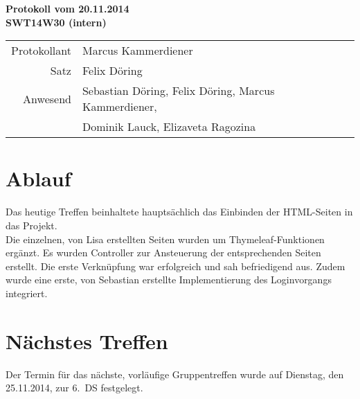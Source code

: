 \documentclass{scrartcl}
\begin{document}
\begin{center}
\LARGE \bf{Protokoll vom 20.11.2014 \\
SWT14W30 (intern)}
\end{center}

\begin{tabular}{rp{10cm}}
Protokollant & Marcus Kammerdiener \\
Satz & Felix Döring \\
Anwesend & Sebastian Döring, Felix Döring, Marcus Kammerdiener,\\
& Dominik Lauck, Elizaveta Ragozina \\
\end{tabular}

\vspace*{3em}

\section{Ablauf}
Das heutige Treffen beinhaltete hauptsächlich das Einbinden der HTML-Seiten in das Projekt. \\
Die einzelnen, von Lisa erstellten Seiten wurden um Thymeleaf-Funktionen ergänzt. Es wurden Controller zur Ansteuerung der entsprechenden Seiten erstellt.
Die erste Verknüpfung war erfolgreich und sah befriedigend aus. Zudem wurde eine erste, von Sebastian erstellte Implementierung des Loginvorgangs integriert.
\section{N\"achstes Treffen}
Der Termin für das nächste, vorläufige Gruppentreffen wurde auf Dienstag, den 25.11.2014, zur 6.~DS festgelegt.
\end{document}
